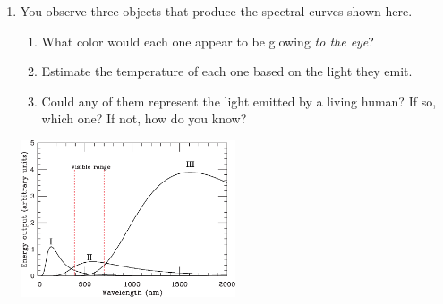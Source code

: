 \documentclass[12pt]{article}
\begin{document}
\begin{enumerate}
\newpage
\item You observe three objects that produce the spectral curves shown here.

\begin{minipage}{0.5\textwidth}
	
	\begin{enumerate}
		\item What color would each one appear to be glowing {\it to the eye}?
		\item Estimate the temperature of each one based on the light they emit.
		\item Could any of them represent the light emitted by a living human? If so, which one? If not, how do you know?
	\end{enumerate}
\end{minipage}
\hspace{0.05\textwidth}
\begin{minipage}{0.4\textwidth}
	\includegraphics[width=2.5in]{three-objects-crop.pdf}
\end{minipage}


\end{enumerate}
\end{document}
